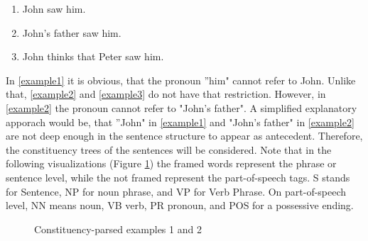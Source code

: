 \begin{center}
	\begin{enumerate}[label={(\arabic*)}]
	\item  \label{example1} John saw him.
	\item  \label{example2} John's father saw him.
	\item  \label{example3} John thinks that Peter saw him.
	\end{enumerate}
\end{center}

In \ref{example1} it is obvious, that the pronoun ''him" cannot refer to John. Unlike that, \ref{example2} and \ref{example3} do not have that restriction. However, in \ref{example2} the pronoun cannot refer to "John's father". A simplified explanatory apporach would be, that ''John" in \ref{example1} and "John's father" in \ref{example2} are not deep enough in the sentence structure to appear as antecedent. Therefore, the constituency trees of the sentences will be considered. Note that in the following visualizations (Figure \ref{fig:twoTreeExample}) the framed words represent the phrase or sentence level, while the not framed represent the part-of-speech tags. S stands for Sentence, NP for noun phrase, and VP for Verb Phrase. On part-of-speech level, NN means noun, VB verb, PR pronoun, and POS for a possessive ending. %

\begin{figure}[h]
    \centering\sffamily
{}
    \caption{Constituency-parsed examples 1 and 2}%
    \label{fig:twoTreeExample}%
\end{figure}

